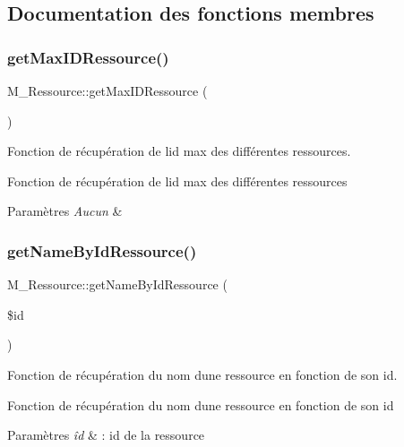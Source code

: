 \subsection{Documentation des fonctions membres}
\mbox{\label{class_m___ressource_a3edc6f0574b55776994086b8c7756f19}} 
\subsubsection{\texorpdfstring{get\+Max\+I\+D\+Ressource()}{getMaxIDRessource()}}
{\footnotesize\ttfamily M\+\_\+\+Ressource\+::get\+Max\+I\+D\+Ressource (\begin{DoxyParamCaption}{ }\end{DoxyParamCaption})}



Fonction de récupération de l\textquotesingle{}id max des différentes ressources. 

Fonction de récupération de l\textquotesingle{}id max des différentes ressources 
\begin{DoxyParams}{Paramètres}
{\em Aucun} & \\
\hline
\end{DoxyParams}
\mbox{\label{class_m___ressource_a2b656abb4229679b9c3496f7f524b52b}} 
\subsubsection{\texorpdfstring{get\+Name\+By\+Id\+Ressource()}{getNameByIdRessource()}}
{\footnotesize\ttfamily M\+\_\+\+Ressource\+::get\+Name\+By\+Id\+Ressource (\begin{DoxyParamCaption}\item[{}]{\$id }\end{DoxyParamCaption})}



Fonction de récupération du nom d\textquotesingle{}une ressource en fonction de son id. 

Fonction de récupération du nom d\textquotesingle{}une ressource en fonction de son id 
\begin{DoxyParams}{Paramètres}
{\em îd} & \+: id de la ressource \\
\hline
\end{DoxyParams}
\mbox{\label{class_m___ressource_ad6d4fedbe62b5d1078c3deae236b06e6}} 

